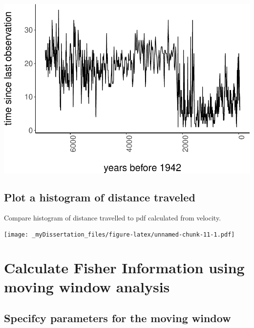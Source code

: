 \documentclass[12pt,twoside,openany]{reedthesis}
\begin{document}
\includegraphics{_myDissertation_files/figure-latex/unnamed-chunk-10-1.pdf}

\hypertarget{plot-a-histogram-of-distance-traveled}{%
\subsection{Plot a histogram of distance traveled}\label{plot-a-histogram-of-distance-traveled}}

Compare histogram of distance travelled to pdf calculated from velocity.

\texttt{[image: \_myDissertation\_files/figure-latex/unnamed-chunk-11-1.pdf]}

\hypertarget{calculate-fisher-information-using-moving-window-analysis}{%
\section{Calculate Fisher Information using moving window analysis}\label{calculate-fisher-information-using-moving-window-analysis}}

\hypertarget{specifcy-parameters-for-the-moving-window}{%
\subsection{Specifcy parameters for the moving window}\label{specifcy-parameters-for-the-moving-window}}
\end{document}
